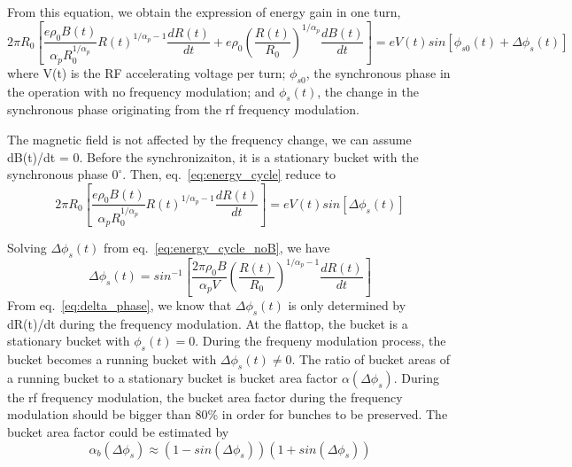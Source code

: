 From this equation, we obtain the expression of energy gain in one turn,
\begin{equation}
2\pi R_0 [\frac {e\rho_0B(t)}{\alpha_pR_0^{1/\alpha_p}}R(t)^{1/\alpha_p-1}\frac{dR(t)}{dt}+e\rho_0 (\frac {R(t)}{R_0})^{1/\alpha_p }\frac{dB(t)}{dt}]=eV(t)sin[\phi_{s0}(t)+\Delta \phi_s(t)]
\label{eq:energy_cycle}
\end{equation} 
where V(t) is the RF accelerating voltage per turn; $\phi_{s0}$, the synchronous phase in the
operation with no frequency modulation; and $\phi_{s}(t)$, the change in the synchronous phase originating from the rf frequency modulation.

The magnetic field is not affected by the frequency change, we can assume dB(t)/dt = 0. Before the synchronizaiton, it is a stationary bucket with the synchronous phase $0^\circ$. Then, eq.~\ref{eq:energy_cycle} reduce to
\begin{equation}
2\pi R_0 [\frac {e\rho_0B(t)}{\alpha_pR_0^{1/\alpha_p}}R(t)^{1/\alpha_p-1}\frac{dR(t)}{dt}]=eV(t)sin[\Delta \phi_s(t)]
\label{eq:energy_cycle_noB}
\end{equation} 

Solving  $\Delta \phi_{s}(t)$  from eq.~\ref{eq:energy_cycle_noB}, we have
\begin{equation}
\Delta \phi_{s}(t)=sin^{-1}[{\frac{2\pi \rho_0 B}{\alpha_pV}(\frac{R(t)}{R_0})^{1/\alpha_p-1}\frac{dR(t)}{dt}}]
\label{eq:delta_phase}
\end{equation} 
From eq.~\ref{eq:delta_phase}, we know that $\Delta \phi_{s}(t)$ is only determined by dR(t)/dt during the frequency modulation.
At the flattop, the bucket is a stationary bucket with $\phi_s(t)=0$. During the frequeny modulation process, the bucket becomes a running bucket with $\Delta\phi_s(t)\ne0$. The ratio of bucket areas of a running bucket to a stationary bucket is bucket area factor $\alpha(\Delta \phi_s)$. During the rf frequency modulation, the bucket area factor during the frequency modulation should be bigger than 80\% in order for bunches to be preserved.
The bucket area factor could be estimated by ~\cite{bucket_factor}
\begin{equation}
\alpha_b(\Delta\phi_s)\approx(1-sin(\Delta \phi_s))(1+sin(\Delta \phi_s))
\label{eq:buckt_area_factor}
\end{equation} 

%

